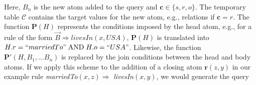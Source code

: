 {\noindent Here, $B_n$ is the new atom added to the query and $\bm{c} \in \{s, r, o\}$. 
The temporary table $\mathcal{C}$ contains the target values for the new atom, e.g., relations
if $\bm{c} = r$. The function $\bm{P}(H)$ represents the conditions imposed by the head atom, e.g., for a rule
of the form $\vec{B} \Rightarrow livesIn(x, USA)$, $\bm{P}(H)$ is translated into 
$H.r = ``marriedTo"\; \text{AND}\; H.o = ``USA"$. Likewise, the function $\bm{P'}(H, B_1, \dots B_n)$
is replaced by the join conditions between the head and body atoms. 
If we apply this scheme to the addition of a closing atom $\bm{r}(z,y)$ in our example rule
\emph{marriedTo}$(x,z) \Rightarrow $ \emph{livesIn}$(x,y)$, we would generate the query
\\\\
}
